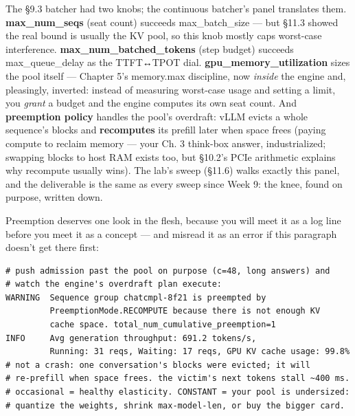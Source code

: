 The §9.3 batcher had two knobs; the continuous batcher's panel translates them. \textbf{max\_num\_seqs} (seat count) succeeds max\_batch\_size — but §11.3 showed the real bound is usually the KV pool, so this knob mostly caps worst-case interference. \textbf{max\_num\_batched\_tokens} (step budget) succeeds max\_queue\_delay as the TTFT↔TPOT dial. \textbf{gpu\_memory\_utilization} sizes the pool itself — Chapter 5's memory.max discipline, now \textit{inside} the engine and, pleasingly, inverted: instead of measuring worst-case usage and setting a limit, you \textit{grant} a budget and the engine computes its own seat count. And \textbf{preemption policy} handles the pool's overdraft: vLLM evicts a whole sequence's blocks and \textbf{recomputes} its prefill later when space frees (paying compute to reclaim memory — your Ch. 3 think-box answer, industrialized; swapping blocks to host RAM exists too, but §10.2's PCIe arithmetic explains why recompute usually wins). The lab's sweep (§11.6) walks exactly this panel, and the deliverable is the same as every sweep since Week 9: the knee, found on purpose, written down.

Preemption deserves one look in the flesh, because you will meet it as a log line before you meet it as a concept — and misread it as an error if this paragraph doesn't get there first:

\begin{terminalbox}
\begin{Verbatim}[breaklines=true,breakanywhere=true,fontsize=\small,formatcom=\color{tbbtermfg},codes=\tbbcodeactive]
# push admission past the pool on purpose (c=48, long answers) and
# watch the engine's overdraft plan execute:
WARNING  Sequence group chatcmpl-8f21 is preempted by
         PreemptionMode.RECOMPUTE because there is not enough KV
         cache space. total_num_cumulative_preemption=1
INFO     Avg generation throughput: 691.2 tokens/s,
         Running: 31 reqs, Waiting: 17 reqs, GPU KV cache usage: 99.8%
# not a crash: one conversation's blocks were evicted; it will
# re-prefill when space frees. the victim's next tokens stall ~400 ms.
# occasional = healthy elasticity. CONSTANT = your pool is undersized:
# quantize the weights, shrink max-model-len, or buy the bigger card.
\end{Verbatim}
\end{terminalbox}

